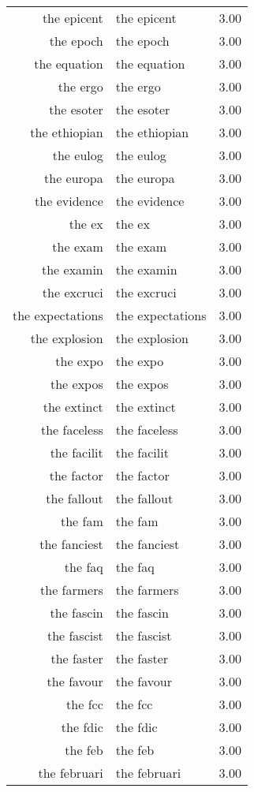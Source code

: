 \begin{table}[ht]
\begin{tabular}{rlr}
  the epicent & the epicent & 3.00 \\ 
  the epoch & the epoch & 3.00 \\ 
  the equation & the equation & 3.00 \\ 
  the ergo & the ergo & 3.00 \\ 
  the esoter & the esoter & 3.00 \\ 
  the ethiopian & the ethiopian & 3.00 \\ 
  the eulog & the eulog & 3.00 \\ 
  the europa & the europa & 3.00 \\ 
  the evidence & the evidence & 3.00 \\ 
  the ex & the ex & 3.00 \\ 
  the exam & the exam & 3.00 \\ 
  the examin & the examin & 3.00 \\ 
  the excruci & the excruci & 3.00 \\ 
  the expectations & the expectations & 3.00 \\ 
  the explosion & the explosion & 3.00 \\ 
  the expo & the expo & 3.00 \\ 
  the expos & the expos & 3.00 \\ 
  the extinct & the extinct & 3.00 \\ 
  the faceless & the faceless & 3.00 \\ 
  the facilit & the facilit & 3.00 \\ 
  the factor & the factor & 3.00 \\ 
  the fallout & the fallout & 3.00 \\ 
  the fam & the fam & 3.00 \\ 
  the fanciest & the fanciest & 3.00 \\ 
  the faq & the faq & 3.00 \\ 
  the farmers & the farmers & 3.00 \\ 
  the fascin & the fascin & 3.00 \\ 
  the fascist & the fascist & 3.00 \\ 
  the faster & the faster & 3.00 \\ 
  the favour & the favour & 3.00 \\ 
  the fcc & the fcc & 3.00 \\ 
  the fdic & the fdic & 3.00 \\ 
  the feb & the feb & 3.00 \\ 
  the februari & the februari & 3.00 \\ 

\end{tabular}
\end{table}
